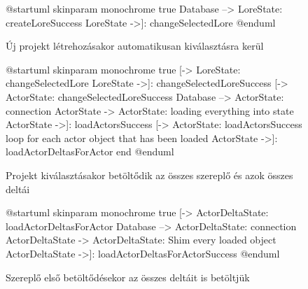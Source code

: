 \begin{figure}[h!]
	\centering
	\begin{plantuml}
		@startuml
		skinparam monochrome true
		Database --> LoreState: createLoreSuccess
		LoreState ->]: changeSelectedLore
		@enduml
	\end{plantuml}
	\caption{Új projekt létrehozásakor automatikusan kiválasztásra kerül}
	\label{fig:global-state-bootstrap}
\end{figure}


\begin{figure}[h!]
	\centering
	\begin{plantuml}
		@startuml
		skinparam monochrome true
		[-> LoreState: changeSelectedLore
		LoreState ->]: changeSelectedLoreSuccess
		[-> ActorState: changeSelectedLoreSuccess
		Database --> ActorState: connection
		ActorState -> ActorState: loading everything into state
		ActorState ->]: loadActorsSuccess
		[-> ActorState: loadActorsSuccess
		loop for each actor object that has been loaded
		ActorState ->]: loadActorDeltasForActor
		end
		@enduml
	\end{plantuml}
	\caption{Projekt kiválasztásakor betöltődik az összes szereplő és azok összes deltái}
	\label{fig:global-state-bootstrap}
\end{figure}

\begin{figure}[h!]
	\centering
	\begin{plantuml}
		@startuml
		skinparam monochrome true
		[-> ActorDeltaState: loadActorDeltasForActor
		Database --> ActorDeltaState: connection
		ActorDeltaState -> ActorDeltaState: Shim every loaded object
		ActorDeltaState ->]: loadActorDeltasForActorSuccess
		@enduml
	\end{plantuml}
	\caption{Szereplő első betöltődésekor az összes deltáit is betöltjük}
	\label{fig:global-state-bootstrap}
\end{figure}

